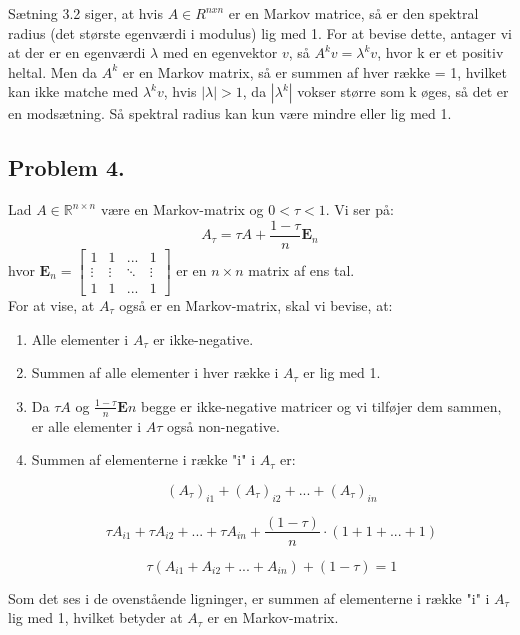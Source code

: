 Sætning 3.2 siger, at hvis $A \in R^{nxn}$ er en Markov matrice, så er den spektral radius (det største egenværdi i modulus) lig med 1. For at bevise dette, antager vi at der er en egenværdi $\lambda$ med en egenvektor $v$, så $A^kv = \lambda^kv$, hvor k er et positiv heltal. Men da $A^k$ er en Markov matrix, så er summen af hver række = 1, hvilket kan ikke matche med $\lambda^kv$, hvis $|\lambda| > 1$, da $|\lambda^k|$ vokser større som k øges, så det er en modsætning. Så spektral radius kan kun være mindre eller lig med 1.

\subsection{Problem 4.}

Lad $A \in \mathbb{R}^{n \times n}$ være en Markov-matrix og $0 < \tau < 1$. Vi ser på: 
$$A_\tau = \tau A + \frac{1-\tau}{n} \mathbf{E}_n$$
hvor $\mathbf{E}_n = \begin{bmatrix} 1 & 1 & ... & 1\\ \vdots & \vdots & \ddots & \vdots\\ 1 & 1 & ... & 1 \end{bmatrix}$ er en $n \times n$ matrix af ens tal.\\

For at vise, at $A_\tau$ også er en Markov-matrix, skal vi bevise, at:
\begin{enumerate}
    \item Alle elementer i $A_\tau$ er ikke-negative.
    \item Summen af alle elementer i hver række i $A_\tau$ er lig med 1.
    \item Da $\tau A$ og $\frac{1-\tau}{n} \mathbf{E}n$ begge er ikke-negative matricer og vi tilføjer dem sammen, er alle elementer i $A\tau$ også non-negative.
    \item Summen af elementerne i række "i" i $A_\tau$ er:
    
    $$(A_\tau)_{i1} + (A_\tau)_{i2} + ... + (A_\tau)_{in}$$ 

$$\tau A_{i1} + \tau A_{i2} + ... + \tau A_{in} + \frac{(1 - \tau)}{n}\cdot (1+1+...+1)$$

$$\tau(A_{i1} + A_{i2} + ... + A_{in}) + (1 - \tau) = 1$$

\end{enumerate}


Som det ses i de ovenstående ligninger, er summen af elementerne i række "i" i $A_\tau$ lig med 1, hvilket betyder at $A_\tau$ er en Markov-matrix.

